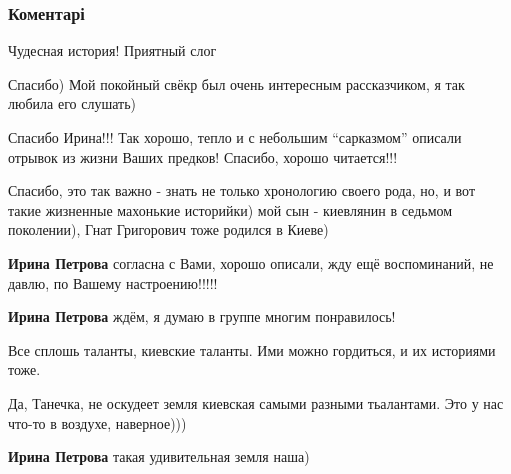  
 
 
 
 
\subsubsection{Коментарі}
\label{sec:14_07_2020.fb.fb_group.story_kiev_ua.1.bajka_bessarabki.cmt}

\begin{itemize} %
Чудесная история!
Приятный слог

\begin{itemize} %
Спасибо) Мой покойный свёкр был очень интересным рассказчиком, я так любила его слушать)
\end{itemize} %


Спасибо Ирина!!! Так хорошо, тепло и с небольшим \enquote{сарказмом} описали отрывок
из жизни Ваших предков! Спасибо, хорошо читается!!!

\begin{itemize} %

Спасибо, это так важно - знать не только хронологию своего рода, но, и вот
такие жизненные махонькие историйки) мой сын - киевлянин в седьмом поколении),
Гнат Григорович тоже родился в Киеве)

\textbf{Ирина Петрова} согласна с Вами, хорошо описали, жду ещё воспоминаний, не давлю, по Вашему настроению!!!!!

\textbf{Ирина Петрова} ждём, я думаю в группе многим понравилось!
\end{itemize} %

Все сплошь таланты, киевские таланты. Ими можно гордиться, и их историями тоже.

\begin{itemize} %

Да, Танечка, не оскудеет земля киевская самыми разными тьалантами. Это у нас
что-то в воздухе, наверное)))

\textbf{Ирина Петрова} такая удивительная земля наша)
\end{itemize} %


\end{itemize}
